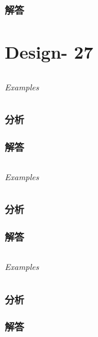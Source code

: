 \documentclass[UTF8,a4paper,12pt]{ctexbook}
\begin{document}
	\subsection{解答}
\chapter{Design- 27}
\section{}
	
	\subparagraph{Examples}
	
	\subsection{分析}
	
	\subsection{解答}
	
\section{}
	
	\subparagraph{Examples}
	
	\subsection{分析}
	
	\subsection{解答}
	
\section{}
	
	\subparagraph{Examples}
	
	\subsection{分析}
	
	\subsection{解答}
	
\section{}
	
\end{document}
